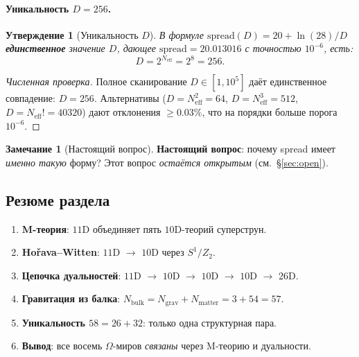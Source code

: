 \documentclass[11pt,a4paper]{article}
\newcommand{\Nbulk}{N_{\text{bulk}}}
\newtheorem{proposition}[theorem]{Утверждение}
\theoremstyle{definition}
\newtheorem{remark}[theorem]{Замечание}
\begin{document}
\paragraph{Уникальность $D = 256$.}
\begin{proposition}[Уникальность $D$]
\label{prop:uniqueness-d-review}
В формуле $\text{spread}(D) = 20 + \ln(28)/D$ \textbf{единственное} 
значение $D$, дающее $\text{spread} = 20.013016$ с точностью 
$10^{-6}$, есть:
\begin{equation}
    \boxed{
    D = 2^{N_{\text{eff}}} = 2^8 = 256.
    }
    \label{eq:unique-d-review}
\end{equation}
\end{proposition}

\begin{proof}[Численная проверка]
Полное сканирование $D \in [1, 10^5]$ даёт единственное 
совпадение: $D = 256$. Альтернативы 
($D = N_{\text{eff}}^2 = 64$, $D = N_{\text{eff}}^3 = 512$, 
$D = N_{\text{eff}}! = 40320$) дают отклонения $\geq 0.03\%$, 
что на порядки больше порога $10^{-6}$.
\end{proof}

\begin{remark}[Настоящий вопрос]
\label{rem:real-question-review}
\textbf{Настоящий вопрос}: почему spread имеет \emph{именно 
такую} форму? Этот вопрос \emph{остаётся открытым} (см.~\S\ref{sec:open}).
\end{remark}
\subsection{Резюме раздела}
\label{subsec:mtheory-summary}

\begin{enumerate}
    \item \textbf{M-теория}: $11$D объединяет пять $10$D-теорий 
          суперструн.
    \item \textbf{Hořava--Witten}: $11$D $\to$ $10$D через 
          $S^1/Z_2$.
    \item \textbf{Цепочка дуальностей}: $11$D $\to$ $10$D 
          $\to$ $10$D $\to$ $10$D $\to$ $26$D.
    \item \textbf{Гравитация из балка}: 
          $\Nbulk = N_{\text{grav}} + N_{\text{matter}} = 3 + 54 = 57$.
    \item \textbf{Уникальность $58 = 26 + 32$}: только одна 
          структурная пара.
    \item \textbf{Вывод}: все восемь $\Omega$-миров \emph{связаны} 
          через M-теорию и дуальности.
\end{enumerate}
\end{document}
